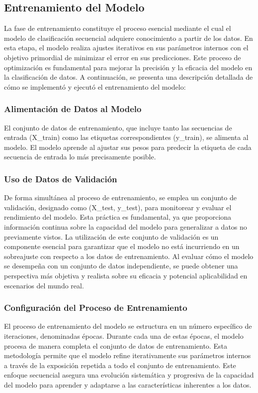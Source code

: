 \subsection{Entrenamiento del Modelo}
La fase de entrenamiento constituye el proceso esencial mediante el cual el modelo de clasificación secuencial adquiere conocimiento a partir de los datos. En esta etapa, el modelo realiza ajustes iterativos en sus parámetros internos con el objetivo primordial de minimizar el error en sus predicciones. Este proceso de optimización es fundamental para mejorar la precisión y la eficacia del modelo en la clasificación de datos. A continuación, se presenta una descripción detallada de cómo se implementó y ejecutó el entrenamiento del modelo:

\subsubsection{Alimentación de Datos al Modelo} 
El conjunto de datos de entrenamiento, que incluye tanto las secuencias de entrada (X\_train) como las etiquetas correspondientes (y\_train), se alimenta al modelo. El modelo aprende al ajustar sus pesos para predecir la etiqueta de cada secuencia de entrada lo más precisamente posible.

\subsubsection{Uso de Datos de Validación} 
De forma simultánea al proceso de entrenamiento, se emplea un conjunto de validación, designado como (X\_test, y\_test), para monitorear y evaluar el rendimiento del modelo. Esta práctica es fundamental, ya que proporciona información continua sobre la capacidad del modelo para generalizar a datos no previamente vistos. La utilización de este conjunto de validación es un componente esencial para garantizar que el modelo no está incurriendo en un sobreajuste con respecto a los datos de entrenamiento. Al evaluar cómo el modelo se desempeña con un conjunto de datos independiente, se puede obtener una perspectiva más objetiva y realista sobre su eficacia y potencial aplicabilidad en escenarios del mundo real.

\subsubsection{Configuración del Proceso de Entrenamiento} 
El proceso de entrenamiento del modelo se estructura en un número específico de iteraciones, denominadas épocas. Durante cada una de estas épocas, el modelo procesa de manera completa el conjunto de datos de entrenamiento. Esta metodología permite que el modelo refine iterativamente sus parámetros internos a través de la exposición repetida a todo el conjunto de entrenamiento. Este enfoque secuencial asegura una evolución sistemática y progresiva de la capacidad del modelo para aprender y adaptarse a las características inherentes a los datos.

